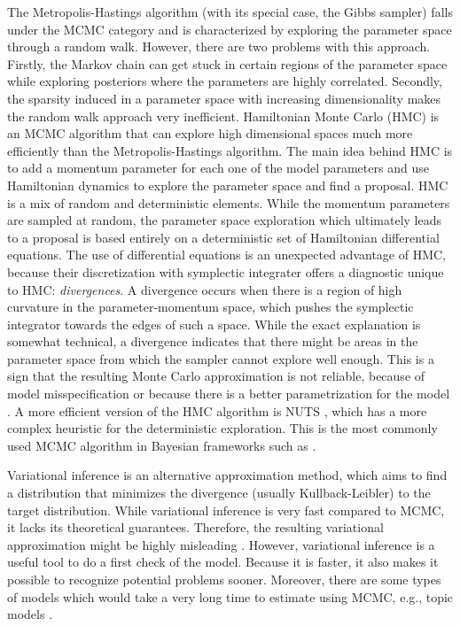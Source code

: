 The Metropolis-Hastings algorithm (with its special case, the Gibbs sampler) falls under the MCMC category and is characterized by exploring the parameter space through a random walk.
However, there are two problems with this approach.
Firstly, the Markov chain can get stuck in certain regions of the parameter space while exploring posteriors where the parameters are highly correlated.
Secondly, the sparsity induced in a parameter space with increasing dimensionality makes the random walk approach very inefficient.
Hamiltonian Monte Carlo (HMC) is an MCMC algorithm that can explore high dimensional spaces much more efficiently than the Metropolis-Hastings algorithm.
The main idea behind HMC is to add a momentum parameter for each one of the model parameters and use Hamiltonian dynamics to explore the parameter space and find a proposal.
HMC is a mix of random and deterministic elements.
While the momentum parameters are sampled at random, the parameter space exploration which ultimately leads to a proposal is based entirely on a deterministic set of Hamiltonian differential equations.
The use of differential equations is an unexpected advantage of HMC, because their discretization with symplectic integrater offers a diagnostic unique to HMC: \textit{divergences}.
A divergence occurs when there is a region of high curvature in the parameter-momentum space, which pushes the symplectic integrator towards the edges of such a space.
While the exact explanation is somewhat technical, a divergence indicates that there might be areas in the parameter space from which the sampler cannot explore well enough.
This is a sign that the resulting Monte Carlo approximation is not reliable, because of model misspecification or because there is a better parametrization for the model \citep{betancourt_conceptual_2017, neal_mcmc_2011}.
A more efficient version of the HMC algorithm is NUTS \citep{hoffman_no-u-turn_2014}, which has a more complex heuristic for the deterministic exploration.
This is the most commonly used MCMC algorithm in Bayesian frameworks such as .

Variational inference is an alternative approximation method, which aims to find a distribution that minimizes the divergence (usually Kullback-Leibler) to the target distribution.
While variational inference is very fast compared to MCMC, it lacks its theoretical guarantees.
Therefore, the resulting variational approximation might be highly misleading \citep{blei_variational_2017}.
However, variational inference is a useful tool to do a first check of the model.
Because it is faster, it also makes it possible to recognize potential problems sooner.
Moreover, there are some types of models which would take a very long time to estimate using MCMC, e.g., topic models \citep{blei_latent_2003}.


